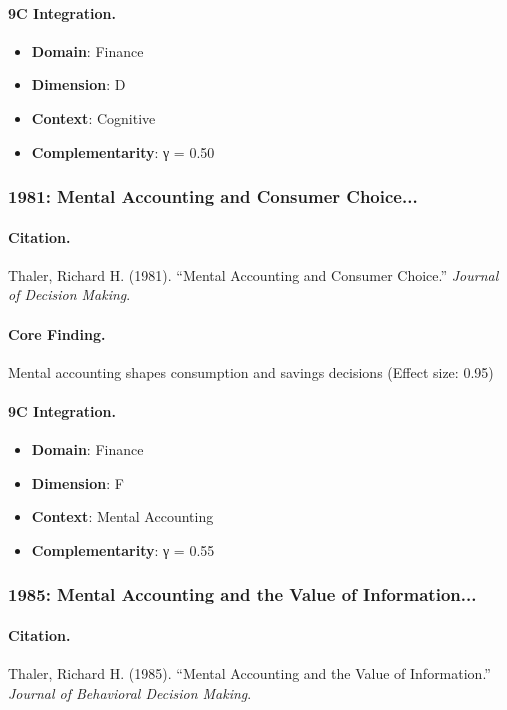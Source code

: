 \paragraph{9C Integration.}
\begin{itemize}[nosep]
  \item \textbf{Domain}: Finance
  \item \textbf{Dimension}: D
  \item \textbf{Context}: Cognitive
  \item \textbf{Complementarity}: γ = 0.50
\end{itemize}

\subsubsection{1981: Mental Accounting and Consumer Choice...}

\paragraph{Citation.}
Thaler, Richard H. (1981). ``Mental Accounting and Consumer Choice.''
\textit{Journal of Decision Making}.

\paragraph{Core Finding.}
Mental accounting shapes consumption and savings decisions (Effect size: 0.95)

\paragraph{9C Integration.}
\begin{itemize}[nosep]
  \item \textbf{Domain}: Finance
  \item \textbf{Dimension}: F
  \item \textbf{Context}: Mental Accounting
  \item \textbf{Complementarity}: γ = 0.55
\end{itemize}

\subsubsection{1985: Mental Accounting and the Value of Information...}

\paragraph{Citation.}
Thaler, Richard H. (1985). ``Mental Accounting and the Value of Information.''
\textit{Journal of Behavioral Decision Making}.

